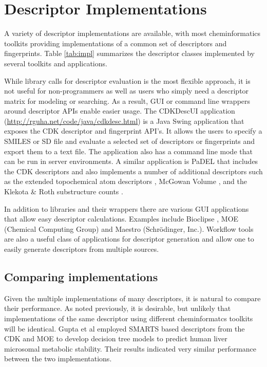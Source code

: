 \documentclass[letterpaper, 12pt]{article}
\begin{document}
\section{Descriptor Implementations}
\label{sec:descr-impl}

A variety of descriptor implementations are available, with most
cheminformatics toolkits providing implementations of a common set of
descriptors and fingerprints. Table \ref{tab:impl} summarizes the
descriptor classes implemented by several toolkits and applications. 

While library calls for descriptor evaluation is the most flexible
approach, it is not useful for non-programmers as well as users who
simply need a descriptor matrix for modeling or searching. As a
result, GUI or command line wrappers around descriptor APIs enable
easier usage. The CDKDescUI application
(\url{http://rguha.net/code/java/cdkdesc.html}) is a Java Swing
application that exposes the CDK descriptor and fingerprint API's. It
allows the users to specify a SMILES or SD file and evaluate a
selected set of descriptors or fingerprints and export them to a text
file. The application also has a command line mode that can be run in
server environments. A similar application is PaDEL \cite{Yap:2011fk}
that includes the CDK descriptors and also implements a number of
additional descriptors such as the extended topochemical atom
descriptors \cite{Roy:2004uq}, McGowan Volume \cite{Zhao:2003kx}, and
the Klekota \& Roth substructure counts \cite{Klekota:2008vn}.

In addition to libraries and their wrappers there are various GUI
applications that allow easy descriptor calculations. Examples include
Bioclipse \cite{Spjuth:2007aa}, MOE (Chemical Computing Group) and
Maestro (Schr\"{o}dinger, Inc.). Workflow tools are also a useful
class of applications for descriptor generation and allow one to
easily generate descriptors from multiple sources.

\subsection{Comparing implementations}
\label{sec:comp-impl}


Given the multiple implementations of many descriptors, it is natural
to compare their performance. As noted previously, it is desirable,
but unlikely that implementations of the same descriptor using
different cheminformatcs toolkits will be identical. Gupta et al
employed SMARTS based descriptors from the CDK and MOE to develop
decision tree models to predict human liver microsomal metabolic
stability\cite{Gupta:2010uq}. Their results indicated very similar
performance between the two implementations. 
\end{document}
